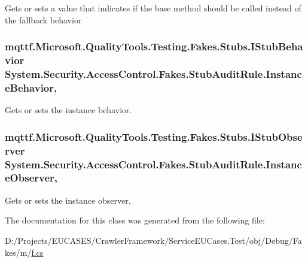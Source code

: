 Gets or sets a value that indicates if the base method should be called instead of the fallback behavior

\hypertarget{class_system_1_1_security_1_1_access_control_1_1_fakes_1_1_stub_audit_rule_a1b7da346a59216b6c1e1f29e0ac3e234}{
\subsubsection[{Instance\-Behavior}]{\setlength{\rightskip}{0pt plus 5cm}mqttf.\-Microsoft.\-Quality\-Tools.\-Testing.\-Fakes.\-Stubs.\-I\-Stub\-Behavior System.\-Security.\-Access\-Control.\-Fakes.\-Stub\-Audit\-Rule.\-Instance\-Behavior\hspace{0.3cm}{\ttfamily [get]}, {\ttfamily [set]}}}\label{class_system_1_1_security_1_1_access_control_1_1_fakes_1_1_stub_audit_rule_a1b7da346a59216b6c1e1f29e0ac3e234}


Gets or sets the instance behavior.

\hypertarget{class_system_1_1_security_1_1_access_control_1_1_fakes_1_1_stub_audit_rule_aaec2f183b714677c26179b1af66838ca}{
\subsubsection[{Instance\-Observer}]{\setlength{\rightskip}{0pt plus 5cm}mqttf.\-Microsoft.\-Quality\-Tools.\-Testing.\-Fakes.\-Stubs.\-I\-Stub\-Observer System.\-Security.\-Access\-Control.\-Fakes.\-Stub\-Audit\-Rule.\-Instance\-Observer\hspace{0.3cm}{\ttfamily [get]}, {\ttfamily [set]}}}\label{class_system_1_1_security_1_1_access_control_1_1_fakes_1_1_stub_audit_rule_aaec2f183b714677c26179b1af66838ca}


Gets or sets the instance observer.



The documentation for this class was generated from the following file\-:\begin{DoxyCompactItemize}
\item 
D\-:/\-Projects/\-E\-U\-C\-A\-S\-E\-S/\-Crawler\-Framework/\-Service\-E\-U\-Cases.\-Test/obj/\-Debug/\-Fakes/m/\hyperlink{m_2f_8cs}{f.\-cs}\end{DoxyCompactItemize}
